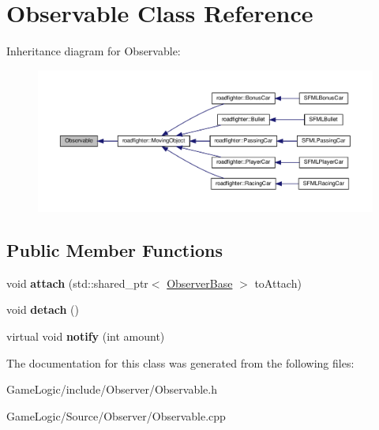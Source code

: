 \hypertarget{classObservable}{}\section{Observable Class Reference}
\label{classObservable}


Inheritance diagram for Observable\+:\nopagebreak
\begin{figure}[H]
\begin{center}
\leavevmode
\includegraphics[width=350pt]{classObservable__inherit__graph}
\end{center}
\end{figure}
\subsection*{Public Member Functions}
\begin{DoxyCompactItemize}
\item 
\mbox{\label{classObservable_a6b67eac0111f9fd37ee182b0b617421b}} 
void {\bfseries attach} (std\+::shared\+\_\+ptr$<$ \hyperlink{classObserverBase}{Observer\+Base} $>$ to\+Attach)
\item 
\mbox{\label{classObservable_ab0523c2c587f258b3f37976ec4951e35}} 
void {\bfseries detach} ()
\item 
\mbox{\label{classObservable_a7dcfb78aab73c197ed731c449454820b}} 
virtual void {\bfseries notify} (int amount)
\end{DoxyCompactItemize}


The documentation for this class was generated from the following files\+:\begin{DoxyCompactItemize}
\item 
Game\+Logic/include/\+Observer/Observable.\+h\item 
Game\+Logic/\+Source/\+Observer/Observable.\+cpp\end{DoxyCompactItemize}
